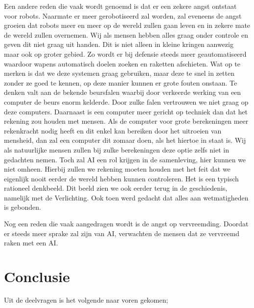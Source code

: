 \documentclass{article}
\begin{document}
Een andere reden die vaak wordt genoemd is dat er een zekere angst ontstaat voor robots. Naarmate er meer gerobotiseerd zal worden, zal eveneens de angst groeien dat robots meer en meer op de wereld zullen gaan leven en in zekere mate de wereld zullen overnemen. Wij als mensen hebben alles graag onder controle en geven dit niet graag uit handen. Dit is niet alleen in kleine kringen aanwezig maar ook op groter gebied. Zo wordt er bij defensie steeds meer geautomatiseerd waardoor wapens automatisch doelen zoeken en raketten afschieten. Wat op te merken is dat we deze systemen graag gebruiken, maar deze te snel in zetten zonder ze goed te kennen, op deze manier kunnen er grote fouten onstaan. Te denken valt aan de bekende beursfalen\cite{vriendofvijand} waarbij door verkeerde werking van een computer de beurs enorm kelderde. Door zulke falen vertrouwen we niet graag op deze computers. Daarnaast is een computer meer gericht op techniek dan dat het rekening zou houden met mensen. Als de computer voor grote berekeningen meer rekenkracht nodig heeft en dit enkel kan bereiken door het uitroeien van mensheid, dan zal een computer dit zomaar doen, als het hiertoe in staat is. Wij als natuurlijke mensen zullen bij zulke berekeningen deze optie zelfs niet in gedachten nemen. Toch zal AI een rol krijgen in de samenleving, hier kunnen we niet omheen. Hierbij zullen we rekening moeten houden met het feit dat we eigenlijk nooit eerder de wereld hebben kunnen controleren. Het is een typisch rationeel denkbeeld. Dit beeld zien we ook eerder terug in de geschiedenis, namelijk met de Verlichting. Ook toen werd gedacht dat alles aan wetmatigheden is gebonden.

Nog een reden die vaak aangedragen wordt is de angst op vervreemding. Doordat er steeds meer sprake zal zijn van AI, verwachten de mensen dat ze vervreemd raken met een AI. 

\section{Conclusie}
Uit de deelvragen is het volgende naar voren gekomen; 

\newpage
\nocite{robotsamenleving,vriendofvijand,arbeidsmarkt,breinoverbodig,stephenhawking,killemachine,uitgeroeid,autonomous,benificialai,pastandfuture}


% 
% 
\end{document}
